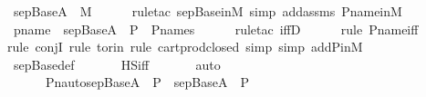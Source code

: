 \begin{isabellebody}
\ {\isachardoublequoteopen}sep{\isacharunderscore}{\kern0pt}Base{\isacharparenleft}{\kern0pt}A{\isacharparenright}{\kern0pt}\ {\isasymin}\ M{\isachardoublequoteclose}\ \isanewline
\ \ \ \ \isamarkupfalse%
{\isacharparenleft}{\kern0pt}rule{\isacharunderscore}{\kern0pt}tac\ sep{\isacharunderscore}{\kern0pt}Base{\isacharunderscore}{\kern0pt}in{\isacharunderscore}{\kern0pt}M{\isacharcomma}{\kern0pt}\ simp\ add{\isacharcolon}{\kern0pt}assms\ P{\isacharunderscore}{\kern0pt}name{\isacharunderscore}{\kern0pt}in{\isacharunderscore}{\kern0pt}M{\isacharparenright}{\kern0pt}\isanewline
\isanewline
\ \ \isamarkupfalse%
\ \isamarkupfalse%
\ pname\ {\isacharcolon}{\kern0pt}\ {\isachardoublequoteopen}sep{\isacharunderscore}{\kern0pt}Base{\isacharparenleft}{\kern0pt}A{\isacharparenright}{\kern0pt}\ {\isasymtimes}\ P\ {\isasymin}\ P{\isacharunderscore}{\kern0pt}names{\isachardoublequoteclose}\ \isanewline
\ \ \ \ \isamarkupfalse%
{\isacharparenleft}{\kern0pt}rule{\isacharunderscore}{\kern0pt}tac\ iffD{}{\isacharparenright}{\kern0pt}\isanewline
\ \ \ \ \ \isamarkupfalse%
{\isacharparenleft}{\kern0pt}rule\ P{\isacharunderscore}{\kern0pt}name{\isacharunderscore}{\kern0pt}iff{\isacharparenright}{\kern0pt}\isanewline
\ \ \ \ \isamarkupfalse%
{\isacharparenleft}{\kern0pt}rule\ conjI{\isacharcomma}{\kern0pt}\ rule\ to{\isacharunderscore}{\kern0pt}rin{\isacharcomma}{\kern0pt}\ rule\ cartprod{\isacharunderscore}{\kern0pt}closed{\isacharcomma}{\kern0pt}\ simp{\isacharcomma}{\kern0pt}\ simp\ add{\isacharcolon}{\kern0pt}P{\isacharunderscore}{\kern0pt}in{\isacharunderscore}{\kern0pt}M{\isacharparenright}{\kern0pt}\isanewline
\ \ \ \ \isamarkupfalse%
\ sep{\isacharunderscore}{\kern0pt}Base{\isacharunderscore}{\kern0pt}def\ \isanewline
\ \ \ \ \isamarkupfalse%
\ HS{\isacharunderscore}{\kern0pt}iff\ \isanewline
\ \ \ \ \isamarkupfalse%
\ auto\ \isanewline
\isanewline
\ \ \isamarkupfalse%
\ {\isachardoublequoteopen}{\isasymAnd}{\isasympi}{\isachardot}{\kern0pt}\ {\isasympi}\ {\isasymin}\ {\isasymG}\ {\isasymLongrightarrow}\ Pn{\isacharunderscore}{\kern0pt}auto{\isacharparenleft}{\kern0pt}{\isasympi}{\isacharparenright}{\kern0pt}{\isacharbackquote}{\kern0pt}{\isacharparenleft}{\kern0pt}sep{\isacharunderscore}{\kern0pt}Base{\isacharparenleft}{\kern0pt}A{\isacharparenright}{\kern0pt}\ {\isasymtimes}\ P{\isacharparenright}{\kern0pt}\ {\isacharequal}{\kern0pt}\ sep{\isacharunderscore}{\kern0pt}Base{\isacharparenleft}{\kern0pt}A{\isacharparenright}{\kern0pt}\ {\isasymtimes}\ P{\isachardoublequoteclose}\ \isanewline

\end{isabellebody}
